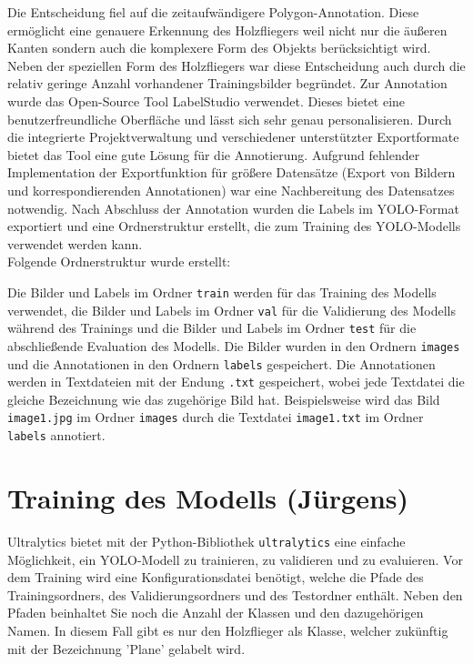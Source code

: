 Die Entscheidung fiel auf die zeitaufwändigere Polygon-Annotation. Diese ermöglicht eine genauere Erkennung des Holzfliegers weil nicht nur die äußeren Kanten sondern auch die komplexere Form des Objekts berücksichtigt wird. 
Neben der speziellen Form des Holzfliegers war diese Entscheidung auch durch die relativ geringe Anzahl vorhandener Trainingsbilder begründet. 
Zur Annotation wurde das Open-Source Tool LabelStudio verwendet. Dieses bietet eine benutzerfreundliche Oberfläche und lässt sich sehr genau personalisieren. Durch die integrierte Projektverwaltung und verschiedener unterstützter Exportformate bietet das Tool eine gute Lösung für die Annotierung.
Aufgrund fehlender Implementation der Exportfunktion für größere Datensätze (Export von Bildern und korrespondierenden Annotationen) war eine Nachbereitung des Datensatzes notwendig. Nach Abschluss der Annotation wurden die Labels im YOLO-Format exportiert und eine Ordnerstruktur erstellt, die zum Training des YOLO-Modells verwendet werden kann.
\\ Folgende Ordnerstruktur wurde erstellt: \\ 


\newpage
Die Bilder und Labels im Ordner \texttt{train} werden für das Training des Modells verwendet, die Bilder und Labels im Ordner \texttt{val} für die Validierung des Modells während des Trainings und die Bilder und Labels im Ordner \texttt{test} für die abschließende Evaluation des Modells.
Die Bilder wurden in den Ordnern \texttt{images} und die Annotationen in den Ordnern \texttt{labels} gespeichert. Die Annotationen werden in Textdateien mit der Endung \texttt{.txt} gespeichert, wobei jede Textdatei die gleiche Bezeichnung wie das zugehörige Bild hat. Beispielsweise wird das Bild \texttt{image1.jpg} im Ordner \texttt{images} durch die Textdatei \texttt{image1.txt} im Ordner \texttt{labels} annotiert.


\section{Training des Modells (Jürgens)}
Ultralytics bietet mit der Python-Bibliothek \texttt{ultralytics} eine einfache Möglichkeit, ein YOLO-Modell zu trainieren, zu validieren und zu evaluieren. Vor dem Training wird eine Konfigurationsdatei benötigt, welche die Pfade des Trainingsordners, des Validierungsordners und des Testordner enthält. Neben den Pfaden beinhaltet Sie noch die Anzahl der Klassen und den dazugehörigen Namen. In diesem Fall gibt es nur den Holzflieger als Klasse, welcher zukünftig mit der Bezeichnung 'Plane' gelabelt wird. \newline

